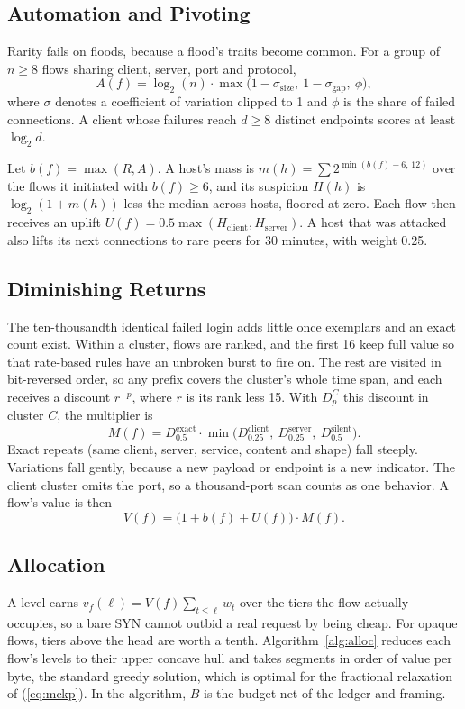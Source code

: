 \documentclass[conference]{IEEEtran}
\begin{document}
\subsection{Automation and Pivoting}
Rarity fails on floods, because a flood's traits become common. For a group of $n\ge 8$ flows sharing client, server, port and protocol,
\begin{equation}
A(f)=\log_2(n)\cdot\max\bigl(1-\sigma_{\text{size}},\ 1-\sigma_{\text{gap}},\ \phi\bigr),
\end{equation}
where $\sigma$ denotes a coefficient of variation clipped to 1 and $\phi$ is the share of failed connections. A client whose failures reach $d\ge 8$ distinct endpoints scores at least $\log_2 d$.

Let $b(f)=\max(R,A)$. A host's mass is $m(h)=\sum 2^{\min(b(f)-6,\,12)}$ over the flows it initiated with $b(f)\ge 6$, and its suspicion $H(h)$ is $\log_2(1+m(h))$ less the median across hosts, floored at zero. Each flow then receives an uplift $U(f)=0.5\max(H_{\text{client}},H_{\text{server}})$. A host that was attacked also lifts its next connections to rare peers for 30 minutes, with weight 0.25.

\subsection{Diminishing Returns}
The ten-thousandth identical failed login adds little once exemplars and an exact count exist. Within a cluster, flows are ranked, and the first 16 keep full value so that rate-based rules have an unbroken burst to fire on. The rest are visited in bit-reversed order, so any prefix covers the cluster's whole time span, and each receives a discount $r^{-p}$, where $r$ is its rank less 15. With $D_p^{C}$ this discount in cluster $C$, the multiplier is
\begin{equation}
M(f)=D_{0.5}^{\text{exact}}\cdot\min\bigl(D_{0.25}^{\text{client}},\ D_{0.25}^{\text{server}},\ D_{0.5}^{\text{silent}}\bigr).
\end{equation}
Exact repeats (same client, server, service, content and shape) fall steeply. Variations fall gently, because a new payload or endpoint is a new indicator. The client cluster omits the port, so a thousand-port scan counts as one behavior. A flow's value is then
\begin{equation}
V(f)=\bigl(1+b(f)+U(f)\bigr)\cdot M(f).
\end{equation}

\subsection{Allocation}
A level earns $v_f(\ell)=V(f)\sum_{t\le\ell} w_t$ over the tiers the flow actually occupies, so a bare SYN cannot outbid a real request by being cheap. For opaque flows, tiers above the head are worth a tenth. Algorithm~\ref{alg:alloc} reduces each flow's levels to their upper concave hull and takes segments in order of value per byte, the standard greedy solution, which is optimal for the fractional relaxation of (\ref{eq:mckp}). In the algorithm, $B$ is the budget net of the ledger and framing.
\end{document}

